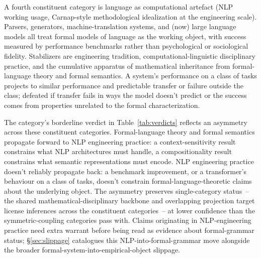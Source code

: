\documentclass[12pt]{article}
\begin{document}
A fourth constituent category is language as computational artefact (NLP working usage, Carnap-style methodological idealization at the engineering scale). Parsers, generators, machine-translation systems, and (now) large language models all treat formal models of language as the working object, with success measured by performance benchmarks rather than psychological or sociological fidelity. Stabilizers are engineering tradition, computational-linguistic disciplinary practice, and the cumulative apparatus of mathematical inheritance from formal-language theory and formal semantics. A system's performance on a class of tasks projects to similar performance and predictable transfer or failure outside the class; defeated if transfer fails in ways the model doesn't predict or the success comes from properties unrelated to the formal characterization.

The category's borderline verdict in Table~\ref{tab:verdicts} reflects an asymmetry across these constituent categories. Formal-language theory and formal semantics propagate forward to NLP engineering practice: a context-sensitivity result constrains what NLP architectures must handle, a compositionality result constrains what semantic representations must encode. NLP engineering practice doesn't reliably propagate back: a benchmark improvement, or a transformer's behaviour on a class of tasks, doesn't constrain formal-language-theoretic claims about the underlying object. The asymmetry preserves single-category status~-- the shared mathematical-disciplinary backbone and overlapping projection target license inferences across the constituent categories~-- at lower confidence than the symmetric-coupling categories pass with. Claims originating in NLP-engineering practice need extra warrant before being read as evidence about formal-grammar status; §\ref{sec:slippage} catalogues this NLP-into-formal-grammar move alongside the broader formal-system-into-empirical-object slippage.
\end{document}
